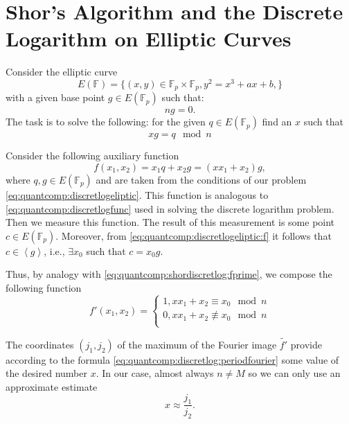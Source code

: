 \section{Shor's Algorithm and the Discrete Logarithm on Elliptic Curves} 
Consider the elliptic curve 
\[
E\left(\mathbb{F}\right) = \{
(x,y) \in \mathbb{F}_p \times \mathbb{F}_p, y^2 = x^3 +a x + b,
\}
\]
with a given base point $g \in E\left(\mathbb{F}_p\right)$ such that: 
\[
n g = 0.
\]
The task is to solve the following: for the given $q
\in E\left(\mathbb{F}_p\right)$ find an $x$ such that
\begin{equation}
x g = q \mod n
\label{eq:quantcomp:discretlogeliptic}
\end{equation}

Consider the following auxiliary function
\begin{equation}
f(x_1, x_2) = x_1 q + x_2 g = \left(x x_1 + x_2\right) g,
\label{eq:quantcomp:discretlogeliptic:f}
\end{equation}
where $q,g \in E\left(\mathbb{F}_p\right)$ and are taken from the conditions of our
problem \eqref{eq:quantcomp:discretlogeliptic}. This function
is analogous to \eqref{eq:quantcomp:discretlogfunc}
used in solving the discrete logarithm problem. Then
we measure this function. The result of this measurement
is some point $c \in E\left(\mathbb{F}_p\right)$. Moreover, from
\eqref{eq:quantcomp:discretlogeliptic:f} it follows that 
$c \in \left<g\right>$, i.e., $\exists x_0$ such that $c = x_0 g$. 

Thus, by analogy with \eqref{eq:quantcomp:shordiscretlog:fprime}, we
compose the following function 
\begin{equation}
\label{eq:quantcomp:shorelliptic:fprime}
f'\left(x_1, x_2\right) = 
\begin{cases}
1, x x_1 + x_2 \equiv x_0 \mod n \\
0, x x_1 + x_2 \not\equiv x_0 \mod n \\
\end{cases}
\end{equation}

The coordinates $(j_1,j_2)$ of the maximum of the Fourier image $\tilde{f'}$ provide
according to the formula
\eqref{eq:quantcomp:discretlog:periodfourier} some value
of the desired number $x$. In our case, almost always $n \ne M$
so we can only use an approximate estimate
\[
x \approx \frac{j_1}{j_2}.
\]

